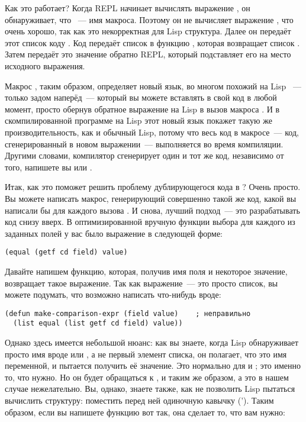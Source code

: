 Как это работает? Когда REPL начинает вычислять выражение , он
обнаруживает, что ~--- имя макроса. Поэтому он не вычисляет выражение
, что очень хорошо, так как это некорректная для Lisp
структура. Далее он передаёт этот список коду . Код 
передаёт список в функцию , которая возвращает список . Затем  передаёт это значение обратно REPL, который
подставляет его на место исходного выражения.

Макрос , таким образом, определяет новый язык, во многом похожий на Lisp
~--- только задом наперёд~--- который вы можете вставлять в свой код в любой момент, просто
обернув обратное выражение на Lisp в вызов макроса . И в скомпилированной
программе на Lisp этот новый язык покажет такую же производительность, как и обычный Lisp,
потому что весь код в макросе~--- код, сгенерированный в новом выражении~--- выполняется
во время компиляции. Другими словами, компилятор сгенерирует один и тот же код, независимо
от того, напишете вы  или .

Итак, как это поможет решить проблему дублирующегося кода в ? Очень просто. Вы
можете написать макрос, генерирующий совершенно такой же код, какой вы написали бы для
каждого вызова . И снова, лучший подход~--- это разрабатывать код снизу
вверх. В оптимизированной вручную функции выбора  для каждого из заданных
полей у вас было выражение в следующей форме:

\begin{lstlisting}
(equal (getf cd field) value)
\end{lstlisting}

Давайте напишем функцию, которая, получив имя поля и некоторое значение, возвращает такое
выражение. Так как выражение~--- это просто список, вы можете подумать, что возможно
написать что-нибудь вроде:

\begin{lstlisting}
(defun make-comparison-expr (field value)    ; неправильно
  (list equal (list getf cd field) value))
\end{lstlisting}

Однако здесь имеется небольшой нюанс: как вы знаете, когда Lisp обнаруживает просто имя
вроде  или , а не первый элемент списка, он полагает, что это имя
переменной, и пытается получить её значение. Это нормально для  и
; это именно то, что нужно. Но он будет обращаться к , 
и  таким же образом, а это в нашем случае нежелательно. Вы, однако, знаете также,
как не позволить Lisp пытаться вычислить структуру: поместить перед ней одиночную кавычку
(\code{}'). Таким образом, если вы напишете функцию  вот так,
она сделает то, что вам нужно:

